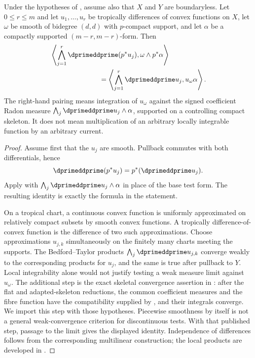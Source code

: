 \begin{theorem}
\label{thm:cld-fibre-projection}
Under the hypotheses of , assume also
that $X$ and $Y$ are boundaryless. Let $0\le r\le m$ and let
$u_1,\ldots,u_r$ be tropically differences of convex functions on $X$, let
$\omega$ be smooth of bidegree $(d,d)$ with $p$-compact support, and let
$\alpha$ be a compactly supported $(m-r,m-r)$-form.  Then
\[
\begin{split}
 &\left\langle
   \bigwedge_{j=1}^r\dprimeddprime(p^*u_j),
   \omega\wedge p^*\alpha\right\rangle\\
 &\hspace{25mm}=
 \left\langle\bigwedge_{j=1}^r\dprimeddprime u_j,
                     u_\omega\alpha\right\rangle .
\end{split}
\]
The right-hand pairing means integration of $u_\omega$ against the
signed coefficient Radon measure
$\bigwedge_j\dprimeddprime u_j\wedge\alpha$, supported on a controlling
compact skeleton. It does not mean multiplication of an arbitrary
locally integrable function by an arbitrary current.
\end{theorem}
\begin{proof}
Assume first that the $u_j$ are smooth.  Pullback commutes with both
differentials, hence
\[
 \dprimeddprime(p^*u_j)=p^*(\dprimeddprime u_j).
\]
Apply  with
$\bigwedge_j\dprimeddprime u_j\wedge\alpha$ in place of the base test form.
The resulting identity is exactly the formula in the statement.

On a tropical chart, a continuous convex function is uniformly approximated
on relatively compact subsets by smooth convex functions.  A tropically
difference-of-convex function is the difference of two such approximations.
Choose approximations $u_{j,k}$ simultaneously on the finitely many charts
meeting the supports.  The Bedford--Taylor products
$\bigwedge_j\dprimeddprime u_{j,k}$ converge weakly to the corresponding
products for $u_j$, and the same is true after pullback to $Y$.  Local integrability alone would not justify testing a weak measure
limit against $u_\omega$. The additional step is the exact skeletal
convergence assertion in \cite[Theorem~16.5.7, proof]{CLD25}:
after the flat and adapted-skeleton reductions, the common coefficient
measures and the fibre function have the compatibility supplied by
\cite[Theorem~16.3.3]{CLD25}, and their integrals converge. We import
this step with those hypotheses. Piecewise smoothness by itself is
not a general weak-convergence criterion for discontinuous tests.
With that published step, passage to the limit gives the displayed
identity. Independence of differences follows from the corresponding
multilinear construction; the local products are developed in
.
\end{proof}


